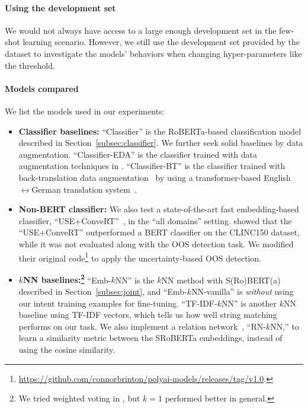 \paragraph{Using the development set}
We would not always have access to a large enough development set in the few-shot learning scenario.
However, we still use the development set provided by the dataset to investigate the models' behaviors when changing hyper-parameters like the threshold. 

\paragraph{Models compared}
We list the models used in our experiments:

\begin{itemize}
\item{\bf Classifier baselines:}
``Classifier'' is the RoBERTa-based classification model described in Section~\ref{subsec:classifier}.
We further seek solid baselines by data augmentation.
``Classifier-EDA'' is the classifier trained with data augmentation techniques in \citet{eda}.
``Classifier-BT'' is the classifier trained with back-translation data augmentation~\citep{qanet,backtrans-da} by using a transformer-based English$\leftrightarrow$German translation system~\citep{transformer}.

\item{\bf Non-BERT classifier:}
We also test a state-of-the-art fast embedding-based classifier, ``USE+ConveRT''~\citep{convert,efficient_intent}, in the ``all domains'' setting.
\citet{efficient_intent} showed that the ``USE+ConveRT'' outperformed a BERT classifier on the CLINC150 dataset, while it was not evaluated along with the OOS detection task.
We modified their original code\footnote{\url{https://github.com/connorbrinton/polyai-models/releases/tag/v1.0}.} to apply the uncertainty-based OOS detection.

\item{\bf $k$NN baselines:\footnote{We tried weighted voting in \citet{knn-classifier}, but $k=1$ performed better in general.}}
``Emb-$k$NN'' is the $k$NN method with S(Ro)BERT(a) described in Section~\ref{subsec:joint}, and ``Emb-$k$NN-vanilla'' is {\it without} using our intent training examples for fine-tuning.
``TF-IDF-$k$NN'' is another $k$NN baseline using TF-IDF vectors, which tells us how well string matching performs on our task.
We also implement a relation network~\citep{relation_net}, ``RN-$k$NN,'' to learn a similarity metric between the SRoBERTa embeddings, instead of using the cosine similarity.


\end{itemize}
